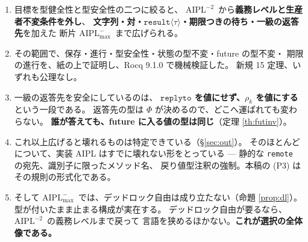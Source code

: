 \documentclass[11pt,a4paper]{ltjsarticle}
\theoremstyle{definition}
\theoremstyle{remark}
\newcommand{\tres}[1]{\ensuremath{\mathtt{result}\langle #1 \rangle}}
\newcommand{\Ph}{\Phi}
\newcommand{\Amax}{\ensuremath{\mathrm{AIPL}^{-}_{\max}}}
\newcommand{\Atwo}{\ensuremath{\mathrm{AIPL}^{-2}}}
\begin{document}
\begin{enumerate}
\item 目標を型健全性と型安全性の二つに絞ると、
  \Atwo\ から\textbf{義務レベルと生産者不変条件を外し}、
  \textbf{文字列・対・\tres{\tau}・期限つきの待ち・一級の返答先}を加えた
  断片 \Amax\ まで広げられる。
\item その範囲で、保存・進行・型安全性・状態の型不変・future の型不変・
  期限の進行を、紙の上で証明し、Rocq 9.1.0 で機械検証した。
  新規 15 定理、いずれも公理なし。
\item 一級の返答先を安全にしているのは、
  \textbf{$\mathtt{replyto}$ を値にせず、$\rho_k$ を値にする}という一段である。
  返答先の型は $\Ph$ が決めるので、どこへ運ばれても変わらない。
  \textbf{誰が答えても、future に入る値の型は同じ}（定理 \ref{th:futinv}）。
\item これ以上広げると壊れるものは特定できている（\S\ref{sec:out}）。
  そのほとんどについて、実装 AIPL はすでに壊れない形をとっている ---
  静的な \texttt{remote} の宛先、識別子に限ったメソッド名、
  戻り値型注釈の強制。本稿の (P3) はその規則の形式化である。
\item そして \Amax\ では、デッドロック自由は成り立たない（命題 \ref{prop:dl}）。
  型が付いたまま止まる構成が実在する。
  デッドロック自由が要るなら、\Atwo\ の義務レベルまで戻って
  言語を狭めるほかない。\textbf{これが選択の全体像である。}
\end{enumerate}
\end{document}
